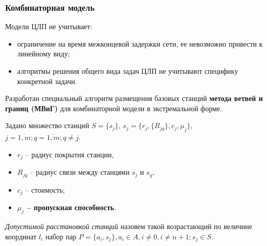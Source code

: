 \begin{frame}
    \frametitle{Комбинаторная модель}
    \justifying
    Модели ЦЛП не учитывает:
    \begin{itemize}
        \item ограничение на время межконцевой задержки сети, ее невозможно привести к линейному виду;
        \item алгоритмы решения общего вида задач ЦЛП не учитывают специфику конкретной задачи.
    \end{itemize}
    

    \bigskip
    Разработан специальный алгоритм размещения базовых станций \textbf{метода ветвей и границ (МВиГ)} для комбинаторной модели в экстремальной форме.

    \bigskip

    Задано множество станций $S = \{s_j\}$, $s_j = \{r_j, \{R_{jq}\}, c_j, \mu_j \}$, $j = \overline{1,m}; q = \overline{1,m}; q \neq j$. 
    \begin{itemize}
        \item $r_j$ -- радиус покрытия станции,
        \item $R_{jq}$ -- радиус связи между станцями $s_j$ и $s_q$,
        \item $c_j$ -- стоимость;
        \item \textbf{$\mu_j$ -- пропускная способность}.
    \end{itemize} 

    \bigskip
    \textit{Допустимой расстановкой станций} назовем такой возрастающий по величине координат $l_i$  набор пар $P = \{a_i, s_j\},a_i \in A,i \neq 0,i \neq n+1;s_j \in S$.

\end{frame}

